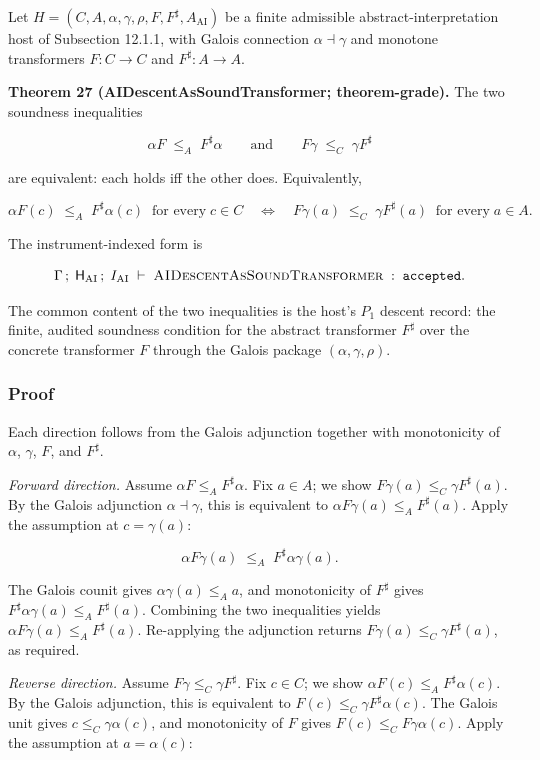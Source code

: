 \documentclass[11pt]{article}
\theoremstyle{definition}
\begin{document}
Let \(H=(C,A,\alpha,\gamma,\rho,F,F^{\sharp},A_{\mathrm{AI}})\) be a finite admissible abstract-interpretation host of Subsection 12.1.1, with Galois connection \(\alpha\dashv\gamma\) and monotone transformers \(F:C\to C\) and \(F^{\sharp}:A\to A\).

\textbf{Theorem 27 (AIDescentAsSoundTransformer; theorem-grade).} The two soundness inequalities

\[
\alpha F\;\le_A\;F^{\sharp}\alpha\qquad\text{and}\qquad F\gamma\;\le_C\;\gamma F^{\sharp}
\]

are equivalent: each holds iff the other does. Equivalently,

\[
\alpha F(c)\;\le_A\;F^{\sharp}\alpha(c)\;\;\text{for every}\;c\in C\quad\Longleftrightarrow\quad F\gamma(a)\;\le_C\;\gamma F^{\sharp}(a)\;\;\text{for every}\;a\in A.
\]

The instrument-indexed form is

\[
\Gamma\,;\;\mathsf H_{\mathrm{AI}}\,;\;I_{\mathrm{AI}}\;\vdash\;\textsc{AIDescentAsSoundTransformer}\;:\;\texttt{accepted}.
\]

The common content of the two inequalities is the host's \(P_1\) descent record: the finite, audited soundness condition for the abstract transformer \(F^{\sharp}\) over the concrete transformer \(F\) through the Galois package \((\alpha,\gamma,\rho)\).

\subsubsection{Proof}

Each direction follows from the Galois adjunction together with monotonicity of \(\alpha\), \(\gamma\), \(F\), and \(F^{\sharp}\).

\emph{Forward direction.} Assume \(\alpha F\le_A F^{\sharp}\alpha\). Fix \(a\in A\); we show \(F\gamma(a)\le_C\gamma F^{\sharp}(a)\). By the Galois adjunction \(\alpha\dashv\gamma\), this is equivalent to \(\alpha F\gamma(a)\le_A F^{\sharp}(a)\). Apply the assumption at \(c=\gamma(a)\):

\[
\alpha F\gamma(a)\;\le_A\;F^{\sharp}\alpha\gamma(a).
\]

The Galois counit gives \(\alpha\gamma(a)\le_A a\), and monotonicity of \(F^{\sharp}\) gives \(F^{\sharp}\alpha\gamma(a)\le_A F^{\sharp}(a)\). Combining the two inequalities yields \(\alpha F\gamma(a)\le_A F^{\sharp}(a)\). Re-applying the adjunction returns \(F\gamma(a)\le_C\gamma F^{\sharp}(a)\), as required.

\emph{Reverse direction.} Assume \(F\gamma\le_C\gamma F^{\sharp}\). Fix \(c\in C\); we show \(\alpha F(c)\le_A F^{\sharp}\alpha(c)\). By the Galois adjunction, this is equivalent to \(F(c)\le_C\gamma F^{\sharp}\alpha(c)\). The Galois unit gives \(c\le_C\gamma\alpha(c)\), and monotonicity of \(F\) gives \(F(c)\le_C F\gamma\alpha(c)\). Apply the assumption at \(a=\alpha(c)\):
\end{document}
